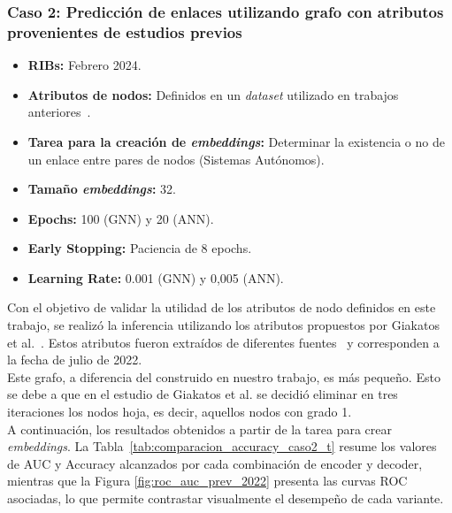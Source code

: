 \subsubsection{Caso 2: Predicción de enlaces utilizando grafo con atributos provenientes de estudios previos}

\begin{itemize}
    \item \textbf{RIBs:} Febrero 2024.
    \item \textbf{Atributos de nodos:} Definidos en un \textit{dataset} utilizado en trabajos anteriores~\cite{BenchmarkingGNN}.
    \item \textbf{Tarea para la creación de \textit{embeddings}:} Determinar la existencia o no de un enlace entre pares de nodos (Sistemas Autónomos).
    \item \textbf{Tamaño \textit{embeddings}:} 32.
    \item \textbf{Epochs:} 100 (GNN) y 20 (ANN).
    \item \textbf{Early Stopping:} Paciencia de 8 epochs.
    \item \textbf{Learning Rate:} 0.001 (GNN) y 0,005 (ANN).
\end{itemize}


Con el objetivo de validar la utilidad de los atributos de nodo definidos en este trabajo, se realizó la inferencia utilizando los atributos propuestos por Giakatos et al.~\cite{BenchmarkingGNN}. Estos atributos fueron extraídos de diferentes fuentes~\cite{PeeringDB,CAIDAAS-rank,BGP2VecCode} y corresponden a la fecha de julio de 2022.  \\

Este grafo, a diferencia del construido en nuestro trabajo, es más pequeño. Esto se debe a que en el estudio de Giakatos et al. se decidió eliminar en tres iteraciones los nodos hoja, es decir, aquellos nodos con grado 1. \\


A continuación, los resultados obtenidos a partir de la tarea para crear \textit{embeddings}. La Tabla~\ref{tab:comparacion_accuracy_caso2_t} resume los valores de AUC y Accuracy alcanzados por cada combinación de encoder y decoder, mientras que la Figura \ref{fig:roc_auc_prev_2022} presenta las curvas ROC asociadas, lo que permite contrastar visualmente el desempeño de cada variante.\\




